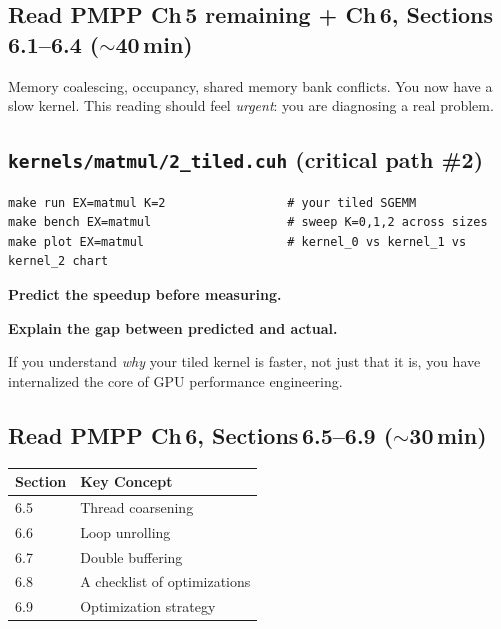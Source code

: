 \documentclass[11pt, letterpaper]{article}
\begin{document}
\subsection{Read PMPP Ch\,5 remaining + Ch\,6, Sections\,6.1--6.4 ($\sim$40\,min)}

Memory coalescing, occupancy, shared memory bank conflicts. You now have a slow kernel. This reading should feel \emph{urgent}: you are diagnosing a real problem.

\subsection{\texttt{kernels/matmul/2\_tiled.cuh} (critical path \#2)}

\begin{verbatim}
make run EX=matmul K=2                 # your tiled SGEMM
make bench EX=matmul                   # sweep K=0,1,2 across sizes
make plot EX=matmul                    # kernel_0 vs kernel_1 vs kernel_2 chart
\end{verbatim}

\begin{stepbox}
\textbf{Predict the speedup before measuring.}

\textbf{Explain the gap between predicted and actual.}

If you understand \emph{why} your tiled kernel is faster, not just that it is, you have internalized the core of GPU performance engineering.
\end{stepbox}

\subsection{Read PMPP Ch\,6, Sections\,6.5--6.9 ($\sim$30\,min)}

\begin{tabularx}{\textwidth}{@{}lX@{}}
\toprule
\textbf{Section} & \textbf{Key Concept} \\
\midrule
6.5 & Thread coarsening \\
6.6 & Loop unrolling \\
6.7 & Double buffering \\
6.8 & A checklist of optimizations \\
6.9 & Optimization strategy \\
\bottomrule
\end{tabularx}

\end{document}
